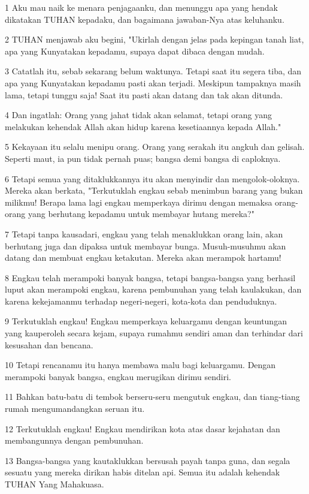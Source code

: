 \par 1 Aku mau naik ke menara penjagaanku, dan menunggu apa yang hendak dikatakan TUHAN kepadaku, dan bagaimana jawaban-Nya atas keluhanku.
\par 2 TUHAN menjawab aku begini, "Ukirlah dengan jelas pada kepingan tanah liat, apa yang Kunyatakan kepadamu, supaya dapat dibaca dengan mudah.
\par 3 Catatlah itu, sebab sekarang belum waktunya. Tetapi saat itu segera tiba, dan apa yang Kunyatakan kepadamu pasti akan terjadi. Meskipun tampaknya masih lama, tetapi tunggu saja! Saat itu pasti akan datang dan tak akan ditunda.
\par 4 Dan ingatlah: Orang yang jahat tidak akan selamat, tetapi orang yang melakukan kehendak Allah akan hidup karena kesetiaannya kepada Allah."
\par 5 Kekayaan itu selalu menipu orang. Orang yang serakah itu angkuh dan gelisah. Seperti maut, ia pun tidak pernah puas; bangsa demi bangsa di caploknya.
\par 6 Tetapi semua yang ditaklukkannya itu akan menyindir dan mengolok-oloknya. Mereka akan berkata, "Terkutuklah engkau sebab menimbun barang yang bukan milikmu! Berapa lama lagi engkau memperkaya dirimu dengan memaksa orang-orang yang berhutang kepadamu untuk membayar hutang mereka?"
\par 7 Tetapi tanpa kausadari, engkau yang telah menaklukkan orang lain, akan berhutang juga dan dipaksa untuk membayar bunga. Musuh-musuhmu akan datang dan membuat engkau ketakutan. Mereka akan merampok hartamu!
\par 8 Engkau telah merampoki banyak bangsa, tetapi bangsa-bangsa yang berhasil luput akan merampoki engkau, karena pembunuhan yang telah kaulakukan, dan karena kekejamanmu terhadap negeri-negeri, kota-kota dan penduduknya.
\par 9 Terkutuklah engkau! Engkau memperkaya keluargamu dengan keuntungan yang kauperoleh secara kejam, supaya rumahmu sendiri aman dan terhindar dari kesusahan dan bencana.
\par 10 Tetapi rencanamu itu hanya membawa malu bagi keluargamu. Dengan merampoki banyak bangsa, engkau merugikan dirimu sendiri.
\par 11 Bahkan batu-batu di tembok berseru-seru mengutuk engkau, dan tiang-tiang rumah mengumandangkan seruan itu.
\par 12 Terkutuklah engkau! Engkau mendirikan kota atas dasar kejahatan dan membangunnya dengan pembunuhan.
\par 13 Bangsa-bangsa yang kautaklukkan bersusah payah tanpa guna, dan segala sesuatu yang mereka dirikan habis ditelan api. Semua itu adalah kehendak TUHAN Yang Mahakuasa.

